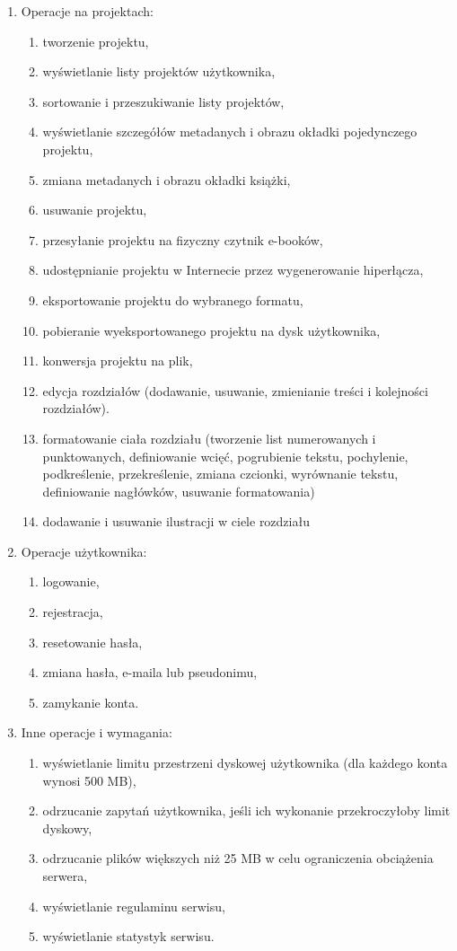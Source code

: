 \begin{enumerate}
    \item Operacje na projektach:
    \begin{enumerate}
        \item tworzenie projektu,
        \item wyświetlanie listy projektów użytkownika,
        \item sortowanie i przeszukiwanie listy projektów,
        \item wyświetlanie szczegółów metadanych i obrazu okładki pojedynczego projektu,
        \item zmiana metadanych i obrazu okładki książki,
        \item usuwanie projektu,
        \item przesyłanie projektu na fizyczny czytnik e-booków,
        \item udostępnianie projektu w Internecie przez wygenerowanie hiperłącza,
        \item eksportowanie projektu do wybranego formatu,
        \item pobieranie wyeksportowanego projektu na dysk użytkownika,
        \item konwersja projektu na plik,
        \item edycja rozdziałów (dodawanie, usuwanie, zmienianie treści i kolejności rozdziałów).
        \item formatowanie ciała rozdziału (tworzenie list numerowanych i punktowanych, definiowanie wcięć, pogrubienie tekstu, pochylenie, podkreślenie, przekreślenie, zmiana czcionki, wyrównanie tekstu, definiowanie nagłówków, usuwanie formatowania)
        \item dodawanie i usuwanie ilustracji w ciele rozdziału
    \end{enumerate}
    
    \item Operacje użytkownika:
        \begin{enumerate}
        \item logowanie,
        \item rejestracja,
        \item resetowanie hasła,
        \item zmiana hasła, e-maila lub pseudonimu,
        \item zamykanie konta.
    \end{enumerate}

    \item Inne operacje i wymagania:
    \begin{enumerate}
        \item wyświetlanie limitu przestrzeni dyskowej użytkownika (dla każdego konta wynosi 500 MB),
        \item odrzucanie zapytań użytkownika, jeśli ich wykonanie przekroczyłoby limit dyskowy,
        \item odrzucanie plików większych niż 25 MB w celu ograniczenia obciążenia serwera,
        \item wyświetlanie regulaminu serwisu,
        \item wyświetlanie statystyk serwisu.
    \end{enumerate}
\end{enumerate}

